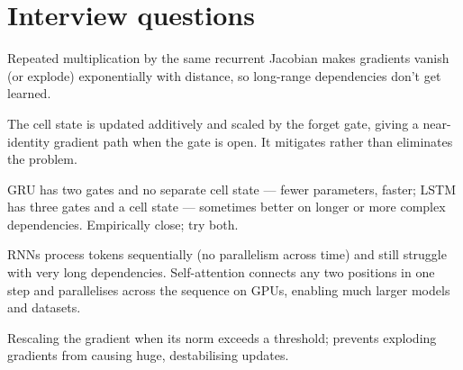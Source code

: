 \section{Interview questions}
\A Repeated multiplication by the same recurrent Jacobian makes gradients vanish (or explode) exponentially with distance, so long-range dependencies don't get learned.

\A The cell state is updated additively and scaled by the forget gate, giving a near-identity gradient path when the gate is open. It mitigates rather than eliminates the problem.

\A GRU has two gates and no separate cell state --- fewer parameters, faster; LSTM has three gates and a cell state --- sometimes better on longer or more complex dependencies. Empirically close; try both.

\A RNNs process tokens sequentially (no parallelism across time) and still struggle with very long dependencies. Self-attention connects any two positions in one step and parallelises across the sequence on GPUs, enabling much larger models and datasets.

\A Rescaling the gradient when its norm exceeds a threshold; prevents exploding gradients from causing huge, destabilising updates.
